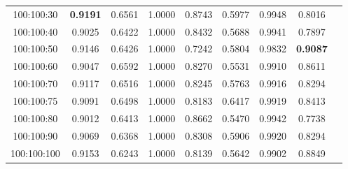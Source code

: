 \begin{table}[ht]
{\begin{tabular}{ccccccccc}
            100:100:30                            & \textbf{0.9191}                               & 0.6561                                         & 1.0000                      & 0.8743             & 0.5977           & 0.9948               & 0.8016            \\
            100:100:40                            & 0.9025                                        & 0.6422                                         & 1.0000                      & 0.8432             & 0.5688           & 0.9941               & 0.7897            \\
            100:100:50                            & 0.9146                                        & 0.6426                                         & 1.0000                      & 0.7242             & 0.5804           & 0.9832               & \textbf{0.9087}   \\
            100:100:60                            & 0.9047                                        & 0.6592                                         & 1.0000                      & 0.8270             & 0.5531           & 0.9910               & 0.8611            \\
            100:100:70                            & 0.9117                                        & 0.6516                                         & 1.0000                      & 0.8245             & 0.5763           & 0.9916               & 0.8294            \\
            100:100:75                            & 0.9091                                        & 0.6498                                         & 1.0000                      & 0.8183             & 0.6417           & 0.9919               & 0.8413            \\
            100:100:80                            & 0.9012                                        & 0.6413                                         & 1.0000                      & 0.8662             & 0.5470           & 0.9942               & 0.7738            \\
            100:100:90                            & 0.9069                                        & 0.6368                                         & 1.0000                      & 0.8308             & 0.5906           & 0.9920               & 0.8294            \\
            100:100:100                           & 0.9153                                        & 0.6243                                         & 1.0000                      & 0.8139             & 0.5642           & 0.9902               & 0.8849            \\

\end{tabular}}
\end{table}
